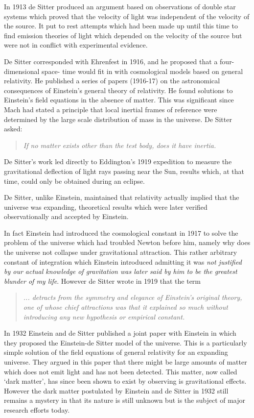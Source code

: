 In 1913 de Sitter produced an argument based on observations of double star systems which proved that the velocity of light was independent of the velocity of the source. It put to rest attempts which had been made up until this time to find emission theories of light which depended on the velocity of the source but were not in conflict with experimental evidence.

De Sitter corresponded with Ehrenfest in 1916, and he proposed that a four- dimensional space- time would fit in with cosmological models based on general relativity. He published a series of papers (1916-17) on the astronomical consequences of Einstein's general theory of relativity. He found solutions to Einstein's field equations in the absence of matter. This was significant since Mach had stated a principle that local inertial frames of reference were determined by the large scale distribution of mass in the universe. De Sitter asked:
\begin{quote}
\textit{If no matter exists other than the test body, does it have inertia.}
\end{quote}

De Sitter's work led directly to Eddington's 1919 expedition to measure the gravitational deflection of light rays passing near the Sun, results which, at that time, could only be obtained during an eclipse.

De Sitter, unlike Einstein, maintained that relativity actually implied that the universe was expanding, theoretical results which were later verified observationally and accepted by Einstein.

In fact Einstein had introduced the cosmological constant in 1917 to solve the problem of the universe which had troubled Newton before him, namely why does the universe not collapse under gravitational attraction. This rather arbitrary constant of integration which Einstein introduced admitting it was \textit{not justified by our actual knowledge of gravitation was later said by him to be the greatest blunder of my life}. However de Sitter wrote in 1919 that the term
\begin{quote}
\textit{... detracts from the symmetry and elegance of Einstein's original theory, one of whose chief attractions was that it explained so much without introducing any new hypothesis or empirical constant.}
\end{quote}

In 1932 Einstein and de Sitter published a joint paper with Einstein in which they proposed the Einstein-de Sitter model of the universe. This is a particularly simple solution of the field equations of general relativity for an expanding universe. They argued in this paper that there might be large amounts of matter which does not emit light and has not been detected. This matter, now called ‘dark matter’, has since been shown to exist by observing is gravitational effects. However the dark matter postulated by Einstein and de Sitter in 1932 still remains a mystery in that its nature is still unknown but is the subject of major research efforts today.

